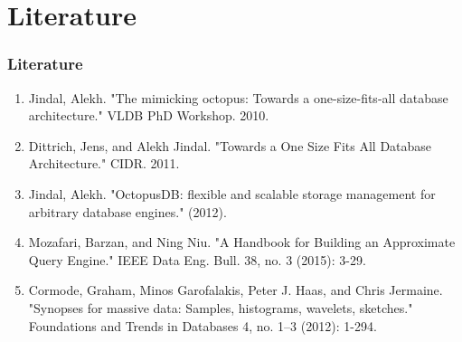 \documentclass{beamer}
\begin{document}
\section{Literature}
\begin{frame}
\frametitle{Literature}
\begin{enumerate}
\item{Jindal, Alekh. "The mimicking octopus: Towards a one-size-fits-all database architecture." VLDB PhD Workshop. 2010.}
\item{Dittrich, Jens, and Alekh Jindal. "Towards a One Size Fits All Database Architecture." CIDR. 2011.}
\item{Jindal, Alekh. "OctopusDB: flexible and scalable storage management for arbitrary database engines." (2012).}
\item{Mozafari, Barzan, and Ning Niu. "A Handbook for Building an Approximate Query Engine." IEEE Data Eng. Bull. 38, no. 3 (2015): 3-29.}
\item{Cormode, Graham, Minos Garofalakis, Peter J. Haas, and Chris Jermaine. "Synopses for massive data: Samples, histograms, wavelets, sketches." Foundations and Trends in Databases 4, no. 1–3 (2012): 1-294.}
\end{enumerate}
\end{frame}
\end{document}

